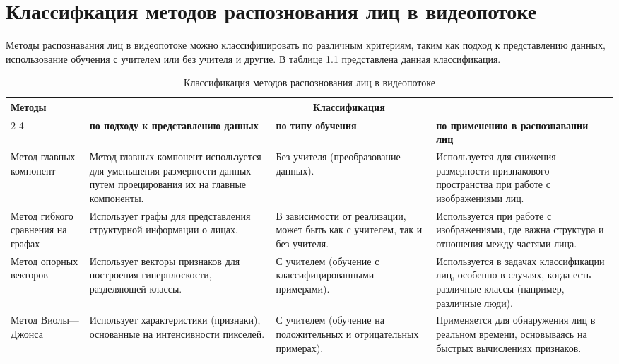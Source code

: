 \chapter{Классифкация методов распознования лиц в видеопотоке}

Методы распознавания лиц в видеопотоке можно классифицировать по различным критериям, таким как подход к представлению данных, использование обучения с учителем или без учителя и другие. В таблице \ref{tab:table} представлена данная классификация.

\begin{table}[h]
    \centering
    \small
    \caption{\label{tab:table} Классификация методов распознования лиц в видеопотоке}
    \begin{tabular}{|p{3cm}|p{4.5cm}|p{4cm}|p{4cm}|}
        \hline
        \multirow{4}{*}{\textbf{Методы}} & \multicolumn{3}{c|}{\textbf{Классификация}} \\
        \cline{2-4}
        & \textbf{по подходу к представлению данных} & \textbf{по типу обучения} & \textbf{по применению в распознавании лиц} \\
        \hline
        Метод главных компонент & Метод главных компонент используется для уменьшения размерности данных путем проецирования их на главные компоненты. & Без учителя (преобразование данных). & Используется для снижения размерности признакового пространства при работе с изображениями лиц. \\
        \hline
        Метод гибкого сравнения на графах & Использует графы для представления структурной информации о лицах. & В зависимости от реализации, может быть как с учителем, так и без учителя. & Используется при работе с изображениями, где важна структура и отношения между частями лица. \\
        \hline
        Метод опорных векторов & Использует векторы признаков для построения гиперплоскости, разделяющей классы. & С учителем (обучение с классифицированными примерами). & Используется в задачах классификации лиц, особенно в случаях, когда есть различные классы (например, различные люди). \\
        \hline
        Метод Виолы---Джонса & Использует характеристики (признаки), основанные на интенсивности пикселей. & С учителем (обучение на положительных и отрицательных примерах). & Применяется для обнаружения лиц в реальном времени, основываясь на быстрых вычислениях признаков. \\
        \hline
    \end{tabular}
\end{table}
